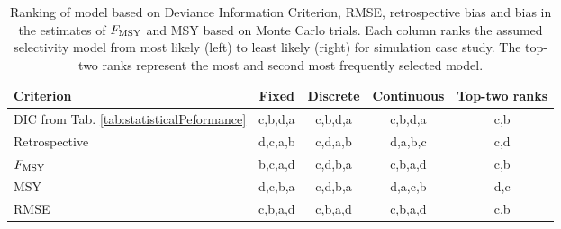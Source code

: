 \begin{table}[!tbh]
	\caption{Ranking of model based on Deviance Information Criterion, RMSE, retrospective bias and bias in the estimates of $F_{\rm{MSY}}$ and MSY based on Monte Carlo trials. Each column ranks the assumed selectivity model from most likely (left) to least likely (right) for simulation case study.  The top-two ranks represent the most and second most frequently selected model.}
	\label{tab:rankorder}
	\begin{center}
		\begin{tabular}{l|ccc|c}
		\hline

		\hline
		\textbf{Criterion} & \textbf{Fixed} & \textbf{Discrete} &\textbf{Continuous} & \textbf{Top-two ranks} \\
		\hline
		DIC from Tab. \ref{tab:statisticalPeformance}
		           & c,b,d,a & c,b,d,a & c,b,d,a & c,b\\
		\hline
		Retrospective    & d,c,a,b & c,d,a,b & d,a,b,c & c,d\\
		$F_{\rm{MSY}}$   & b,c,a,d & c,d,b,a & c,b,a,d & c,b\\
		MSY              & d,c,b,a & c,d,b,a & d,a,c,b & d,c\\
		RMSE             & c,b,a,d & c,b,a,d & c,b,a,d & c,b\\
		\hline

		\hline
		\end{tabular}
	\end{center}
\end{table}


